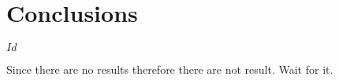 \chapter{Conclusions}

\begin{svn_verze}
$Id$
\end{svn_verze}

Since there are no results therefore there are not result. Wait for it. 
